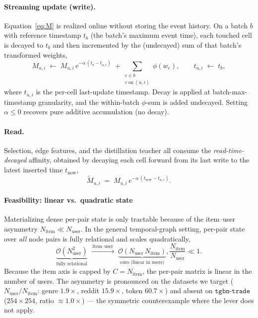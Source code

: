 \paragraph{Streaming update (write).}
Equation~\eqref{eq:M} is realized online without storing the event history. On a
batch $b$ with reference timestamp $t_b$ (the batch's maximum event time), each
touched cell is decayed to $t_b$ and then incremented by the (undecayed) sum of
that batch's transformed weights,
\begin{equation}
M_{u,i} \;\leftarrow\;
M_{u,i}\, e^{-\alpha\,(t_b - t_{u,i})}
\;+\!\!\sum_{\substack{e\in b\\ e\ \text{on}\ (u,i)}}\!\! \phi(w_e),
\qquad
t_{u,i} \;\leftarrow\; t_b,
\label{eq:write}
\end{equation}
where $t_{u,i}$ is the per-cell last-update timestamp. Decay is applied at
batch-max-timestamp granularity, and the within-batch $\phi$-sum is added
undecayed. Setting $\alpha\le 0$ recovers pure additive accumulation (no decay).

\paragraph{Read.}
Selection, edge features, and the distillation teacher all consume the
\emph{read-time-decayed} affinity, obtained by decaying each cell forward from its
last write to the latest inserted time $t_{\text{now}}$,
\begin{equation}
\tilde M_{u,i}
\;=\;
M_{u,i}\, e^{-\alpha\,(t_{\text{now}} - t_{u,i})}.
\label{eq:read}
\end{equation}


\paragraph{Feasibility: linear vs.\ quadratic state}
\label{subsec:feasibility}

Materializing dense per-pair state is only tractable because of the item--user
asymmetry $N_{\text{item}}\ll N_{\text{user}}$. In the general temporal-graph
setting, per-pair state over \emph{all} node pairs is fully relational and scales
quadratically,
\begin{equation}
\underbrace{\mathcal{O}\!\left(N_{\text{user}}^{2}\right)}_{\text{fully relational}}
\;\xrightarrow{\ \text{item--user}\ }\;
\underbrace{\mathcal{O}\!\left(N_{\text{user}}\, N_{\text{item}}\right)}_{\text{ours (linear in users)}},
\frac{N_{\text{item}}}{N_{\text{user}}}\ll 1 .
\label{eq:complexity}
\end{equation}
Because the item axis is capped by $C=N_{\text{item}}$, the per-pair matrix is
linear in the number of users. The asymmetry is pronounced on the datasets we
target ($N_{\text{user}}/N_{\text{item}}$: genre $1.9\times$, reddit $15.9\times$,
token $60.7\times$) and absent on $\texttt{tgbn-trade}$
($254{\times}254$, ratio $\approx 1.0\times$) --- the symmetric counterexample
where the lever does not apply.


